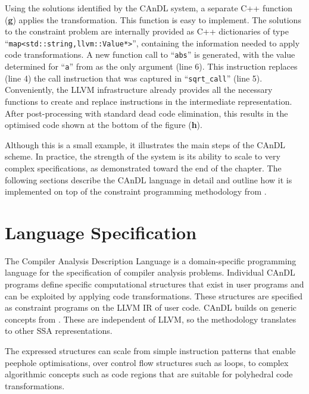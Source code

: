     Using the solutions identified by the CAnDL system, a separate C++ function
    ({\bf g}) applies the transformation.
    This function is easy to implement.
    The solutions to the constraint problem are internally provided as C++
    dictionaries of type
    ``\lstinline[language=MyCpp]!map<std::string,llvm::Value*>!'', containing
    the information needed to apply code transformations.
    A new function call to ``{\tt abs}'' is generated, with the value
    determined for ``{\tt a}'' from  as the only argument
    (line 6).
    This instruction replaces (line 4) the call instruction that was captured
    in ``{\tt sqrt\_call}'' (line 5).
    Conveniently, the LLVM infrastructure already provides all the necessary
    functions to create and replace instructions in the intermediate
    representation.
    After post-processing with standard dead code elimination, this results in
    the optimised code shown at the bottom of the figure ({\bf h}).

    Although this is a small example, it illustrates the main steps of the
    CAnDL scheme.
    In practice, the strength of the system is its ability to scale to very
    complex specifications, as demonstrated toward the end of the chapter.
    The following sections describe the CAnDL language in detail and outline
    how it is implemented on top of the constraint programming methodology
    from .

\begin{figure}[p]
    
    \label{fig:candlexample}
\end{figure}

\section{Language Specification}

    The Compiler Analysis Description Language is a domain-specific
    programming language for the specification of compiler analysis problems. 
    Individual CAnDL programs define specific computational structures that
    exist in user programs and can be exploited by applying code
    transformations.
    These structures are specified as constraint programs on the LLVM IR
    of user code.
    CAnDL builds on generic concepts from .
    These are independent of LLVM, so the methodology translates to other SSA
    representations.

    The expressed structures can scale from simple instruction patterns that
    enable peephole optimisations, over control flow structures such as loops,
    to complex algorithmic concepts such as code regions that are suitable for
    polyhedral code transformations.

